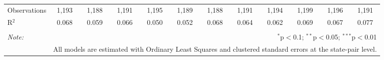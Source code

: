 \begin{table}[!htbp]
\begin{tabular}{@{\extracolsep{5pt}}lccccccccccc}
Observations & 1,193 & 1,188 & 1,191 & 1,195 & 1,189 & 1,188 & 1,191 & 1,194 & 1,199 & 1,196 & 1,191 \\ 
R$^{2}$ & 0.068 & 0.059 & 0.066 & 0.050 & 0.052 & 0.068 & 0.064 & 0.062 & 0.069 & 0.067 & 0.077 \\ 
\hline 
\hline \\[-1.8ex] 
\textit{Note:}  & \multicolumn{11}{r}{$^{*}$p$<$0.1; $^{**}$p$<$0.05; $^{***}$p$<$0.01} \\ 
 & \multicolumn{11}{r}{All models are estimated with Ordinary Least Squares and clustered standard errors at the state-pair level.} \\ 
\end{tabular} 
\end{table} 
